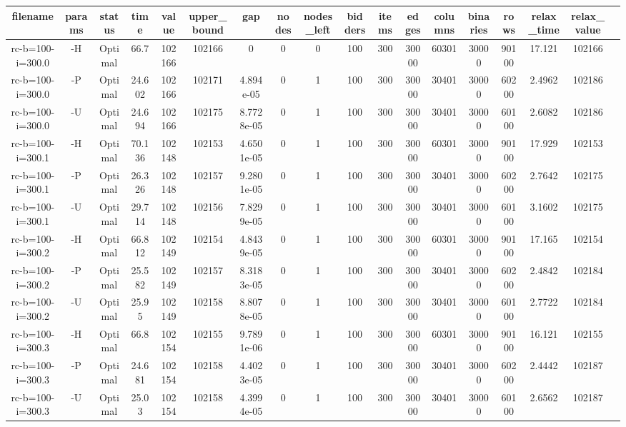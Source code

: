 \documentclass[landscape, a4paper]{article}
\begin{document}
\tiny

\begin{center}
\begin{tabular}{@{}cccccccccccccccccc@{}}
filename & params & status & time & value & upper\_bound & gap & nodes & nodes\_left & bidders & items & edges & columns & binaries & rows & relax\_time & relax\_value & \\
\hline
rc-b=100-i=300.0 & -H & Optimal & 66.7 & 102166 & 102166 & 0 & 0 & 0 & 100 & 300 & 30000 & 60301 & 30000 & 90100 & 17.121 & 102166 & \\
rc-b=100-i=300.0 & -P & Optimal & 24.602 & 102166 & 102171 & 4.894e-05 & 0 & 1 & 100 & 300 & 30000 & 30401 & 30000 & 60200 & 2.4962 & 102186 & \\
rc-b=100-i=300.0 & -U & Optimal & 24.694 & 102166 & 102175 & 8.7728e-05 & 0 & 1 & 100 & 300 & 30000 & 30401 & 30000 & 60100 & 2.6082 & 102186 & \\
rc-b=100-i=300.1 & -H & Optimal & 70.136 & 102148 & 102153 & 4.6501e-05 & 0 & 1 & 100 & 300 & 30000 & 60301 & 30000 & 90100 & 17.929 & 102153 & \\
rc-b=100-i=300.1 & -P & Optimal & 26.326 & 102148 & 102157 & 9.2801e-05 & 0 & 1 & 100 & 300 & 30000 & 30401 & 30000 & 60200 & 2.7642 & 102175 & \\
rc-b=100-i=300.1 & -U & Optimal & 29.714 & 102148 & 102156 & 7.8299e-05 & 0 & 1 & 100 & 300 & 30000 & 30401 & 30000 & 60100 & 3.1602 & 102175 & \\
rc-b=100-i=300.2 & -H & Optimal & 66.812 & 102149 & 102154 & 4.8439e-05 & 0 & 1 & 100 & 300 & 30000 & 60301 & 30000 & 90100 & 17.165 & 102154 & \\
rc-b=100-i=300.2 & -P & Optimal & 25.582 & 102149 & 102157 & 8.3183e-05 & 0 & 1 & 100 & 300 & 30000 & 30401 & 30000 & 60200 & 2.4842 & 102184 & \\
rc-b=100-i=300.2 & -U & Optimal & 25.95 & 102149 & 102158 & 8.8078e-05 & 0 & 1 & 100 & 300 & 30000 & 30401 & 30000 & 60100 & 2.7722 & 102184 & \\
rc-b=100-i=300.3 & -H & Optimal & 66.8 & 102154 & 102155 & 9.7891e-06 & 0 & 1 & 100 & 300 & 30000 & 60301 & 30000 & 90100 & 16.121 & 102155 & \\
rc-b=100-i=300.3 & -P & Optimal & 24.681 & 102154 & 102158 & 4.4023e-05 & 0 & 1 & 100 & 300 & 30000 & 30401 & 30000 & 60200 & 2.4442 & 102187 & \\
rc-b=100-i=300.3 & -U & Optimal & 25.03 & 102154 & 102158 & 4.3994e-05 & 0 & 1 & 100 & 300 & 30000 & 30401 & 30000 & 60100 & 2.6562 & 102187 & \\

\end{tabular}
\end{center}
\end{document}
